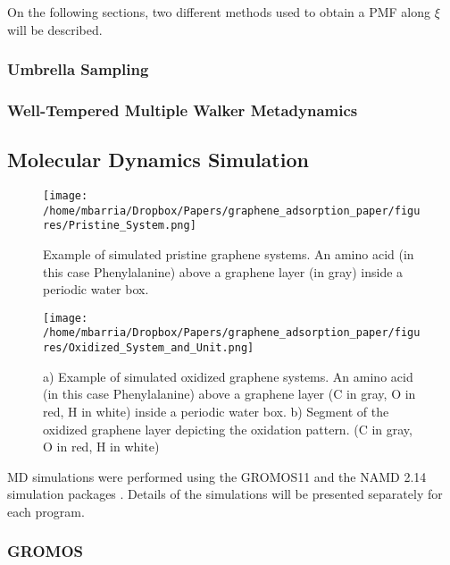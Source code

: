 \documentclass[twoside,twocolumn,9pt]{article}
\begin{document}
On the following sections, two different methods used to obtain a PMF along $\xi$ will be described.

\subsubsection{Umbrella Sampling}

\subsubsection{Well-Tempered Multiple Walker Metadynamics}

\subsection{Molecular Dynamics Simulation}

\begin{figure}[htbp]
\centerline{\texttt{[image: /home/mbarria/Dropbox/Papers/graphene\_adsorption\_paper/figures/Pristine\_System.png]}}
\caption[]{\label{fig:system-pristine} Example of simulated pristine
  graphene systems. An amino acid (in this case Phenylalanine) above a
  graphene layer (in gray) inside a periodic water box.}
\end{figure}

\begin{figure}[htbp]
\centerline{\texttt{[image: /home/mbarria/Dropbox/Papers/graphene\_adsorption\_paper/figures/Oxidized\_System\_and\_Unit.png]}}
\caption[]{\label{fig:system-oxidized} a) Example of simulated oxidized
  graphene systems. An amino acid (in this case Phenylalanine) above a
  graphene layer (C in gray, O in red, H in white) inside a periodic
  water box. b) Segment of the oxidized graphene layer depicting the
  oxidation pattern. (C in gray, O in red, H in white)}
\end{figure}

MD simulations were performed using the GROMOS11 \cite{Riniker_2011,
  Schmid_2012} and the NAMD 2.14 simulation packages
\cite{Phillips_2020}.  Details of the simulations will be presented
separately for each program.

\subsubsection{GROMOS}
\end{document}
